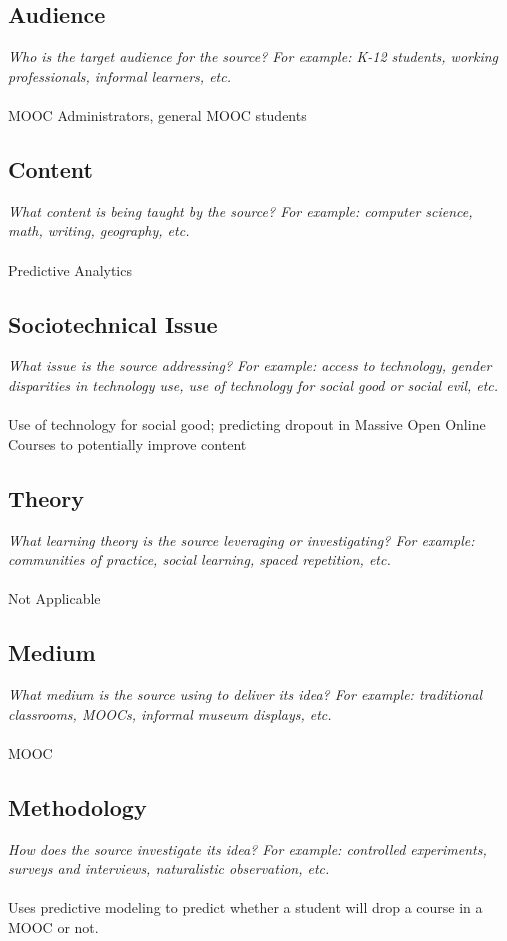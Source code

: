 \documentclass[12pt, final]{article}
\begin{document}
\subsection{Audience}
\textit{Who is the target audience for the source? For example: K-12 students, working professionals, informal learners, etc.}
\\
\\
MOOC Administrators, general MOOC students

\subsection{Content}
\textit{What content is being taught by the source? For example: computer science, math, writing, geography, etc.}
\\
\\
Predictive Analytics

\subsection{Sociotechnical Issue}
\textit{What issue is the source addressing? For example: access to technology, gender disparities in technology use, use of technology for social good or social evil, etc.}
\\
\\
Use of technology for social good; predicting dropout in Massive Open Online Courses to potentially improve content

\subsection{Theory}
\textit{What learning theory is the source leveraging or investigating? For example: communities of practice, social learning, spaced repetition, etc.}
\\
\\
Not Applicable

\subsection{Medium}
\textit{What medium is the source using to deliver its idea? For example: traditional classrooms, MOOCs, informal museum displays, etc.}
\\
\\
MOOC

\subsection{Methodology}
\textit{How does the source investigate its idea? For example: controlled experiments, surveys and interviews, naturalistic observation, etc.}
\\
\\
Uses predictive modeling to predict whether a student will drop a course in a MOOC or not. 
\end{document}

